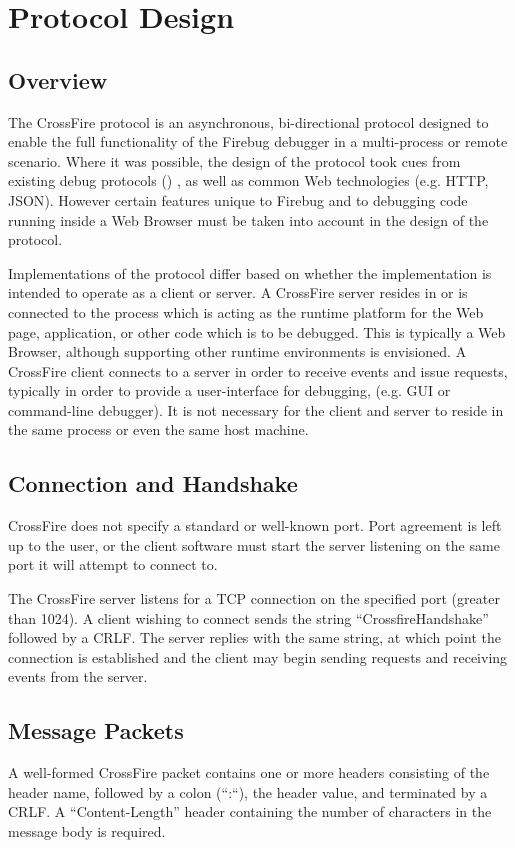 \section {Protocol Design}
\subsection {Overview}
The CrossFire protocol is an asynchronous, bi-directional protocol designed to
enable the full functionality of the Firebug debugger in a multi-process or
remote scenario. Where it was possible, the design of the protocol took cues
from existing debug protocols () , as well as common Web technologies (e.g.
HTTP\cite{http}, JSON\cite{json}). However certain features unique to Firebug
and to debugging code running inside a Web Browser must be taken into account in
the design of the protocol.

Implementations of the protocol differ based on whether the implementation is
intended to operate as a client or server. A CrossFire server resides in or is
connected to the process which is acting as the runtime platform for the Web
page, application, or other code which is to be debugged. This is typically a
Web Browser, although supporting other runtime environments is envisioned. A
CrossFire client connects to a server in order to receive events and issue
requests, typically in order to provide a user-interface
for debugging, (e.g. GUI or command-line debugger). It is not necessary for the
client and server to reside in the same process or even the same host machine.

\subsection {Connection and Handshake}
CrossFire does not specify a standard or well-known port. Port agreement is left
up to the user, or the client software must start the server listening on
the same port it will attempt to connect to.

The CrossFire server listens for a TCP connection on the specified port
(greater than 1024).  A client wishing to connect sends the string
``CrossfireHandshake'' followed by a CRLF. The server replies with the same
string, at which point the connection is established and the client may begin
sending requests and receiving events from the server.

\subsection {Message Packets}
A well-formed CrossFire packet contains one or more headers consisting of the
header name, followed by a colon (``:``), the header value, and terminated by a
CRLF. A ``Content-Length'' header containing the number of characters in the
message body is required.

